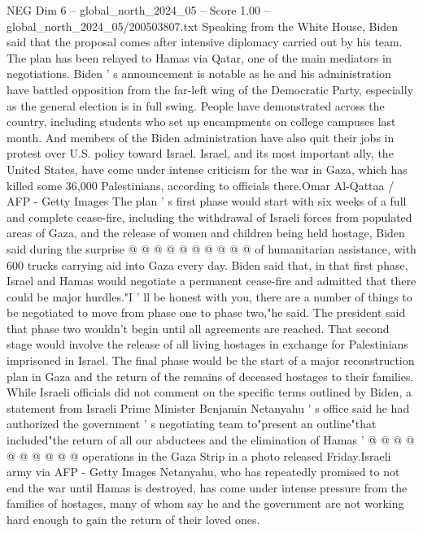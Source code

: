 \begin{textsample}{NEG Dim 6 – global\_north\_2024\_05 – Score 1.00 – global\_north\_2024\_05/200503807.txt}  \label{ex:f6_neg_294}
Speaking from the White House, Biden said that the proposal comes after intensive diplomacy carried out by his team.
The plan has been relayed to Hamas via Qatar, one of the main mediators in negotiations.
Biden ' s announcement is notable as he and his administration have battled opposition from the far-left wing of the Democratic Party, especially as the general election is in full swing.
People have demonstrated across the country, including students who set up encampments on college campuses last month.
And members of the Biden administration have also quit their jobs in protest over U.S. policy toward Israel.
Israel, and its most important ally, the United States, have come under intense criticism for the war in Gaza, which has killed some 36,000 Palestinians, according to officials there.Omar Al-Qattaa / AFP - Getty Images The plan ' s first phase would start with six weeks of a full and complete cease-fire, including the withdrawal of Israeli forces from populated areas of Gaza, and the release of women and children being held hostage, Biden said during the surprise @ @ @ @ @ @ @ @ @ @ of humanitarian assistance, with 600 trucks carrying aid into Gaza every day.
Biden said that, in that first phase, Israel and Hamas would negotiate a permanent cease-fire and admitted that there could be major hurdles."I ' ll be honest with you, there are a number of things to be negotiated to move from phase one to phase two,"he said.
The president said that phase two wouldn't begin until all agreements are reached.
That second stage would involve the release of all living hostages in exchange for Palestinians imprisoned in Israel.
The final phase would be the start of a major reconstruction plan in Gaza and the return of the remains of deceased hostages to their families.
While Israeli officials did not comment on the specific terms outlined by Biden, a statement from Israeli Prime Minister Benjamin Netanyahu ' s office said he had authorized the government ' s negotiating team to"present an outline"that included"the return of all our abductees and the elimination of Hamas ' @ @ @ @ @ @ @ @ @ @ operations in the Gaza Strip in a photo released Friday.Israeli army via AFP - Getty Images Netanyahu, who has repeatedly promised to not end the war until Hamas is destroyed, has come under intense pressure from the families of hostages, many of whom say he and the government are not working hard enough to gain the return of their loved ones.

\end{textsample}
